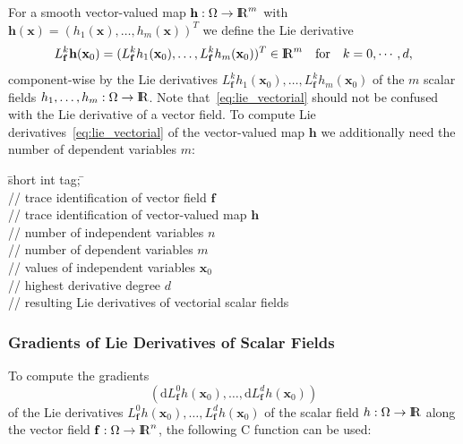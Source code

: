 \documentclass[11pt,twoside]{article}
\newcommand{\R}{{ {\rm I} \kern -.225em {\rm R} }}
\begin{document}
For a smooth vector-valued map $\mathbf h: \Omega\rightarrow \R^m$ with 
$\mathbf h(\mathbf x)=(h_1(\mathbf x),\ldots,h_m(\mathbf x))^T$
we define the Lie derivative
\begin{equation}\label{eq:lie_vectorial}
L_\mathbf f^k\mathbf h(\mathbf x_0)=
(L_\mathbf f^kh_1(\mathbf x_0),\ldots,L_\mathbf f^kh_m(\mathbf x_0))^T\in\R^m
 \quad \text{for}\quad k = 0, \cdots, d,
\end{equation}
component-wise by the Lie derivatives $L_\mathbf f^k h_1(\mathbf x_0),\ldots,L_\mathbf f^k h_m(\mathbf x_0)$ of the $m$ scalar fields $h_1, \ldots, h_m:\Omega\to\R$. Note that~\eqref{eq:lie_vectorial} should not be confused with the Lie derivative of a vector field. To compute Lie derivatives~\eqref{eq:lie_vectorial} of the vector-valued map $\mathbf h$
we additionally need the number of dependent variables $m$:

\begin{tabbing}
\hspace{0.5in}\={\sf short int tag;} \hspace{1.1in}\= \kill    %
\\
         \> // trace identification of vector field $\mathbf f$ \\
         \> // trace identification of vector-valued map $\mathbf h$\\
               \> // number of independent variables $n$\\
               \> // number of dependent variables $m$\\
          \> // values of independent variables $\mathbf{x}_0$\\
              \> // highest derivative degree $d$\\
 \> // resulting Lie derivatives of vectorial scalar fields\\
\end{tabbing}  

\subsubsection*{Gradients of Lie Derivatives of Scalar Fields}
To compute the gradients 
\[
(\mathrm{d}L_\mathbf f^0h(\mathbf x_0),\ldots, \mathrm{d}L_\mathbf f^dh(\mathbf x_0))
\]
of the Lie derivatives $L_\mathbf f^0h(\mathbf x_0),\ldots, L_\mathbf f^dh(\mathbf x_0)$ of the scalar field $h:\Omega\to\R$ along the vector field $\mathbf f:\Omega\to\R^n$,
the following C function can be used:
\end{document}
